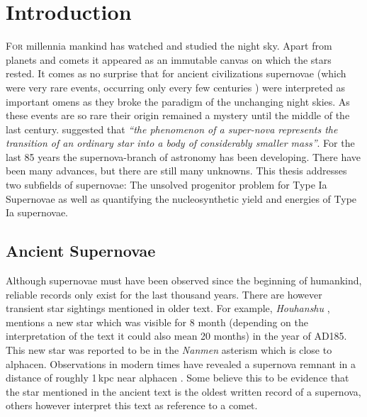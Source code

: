 \chapter{Introduction}
\label{chap:intro}

\lettrine[lines=4]{F}{or} millennia mankind has watched and studied the night sky. Apart from planets and comets it appeared as an immutable canvas on which the stars rested. It comes as no surprise that for ancient civilizations supernovae (which were very rare events, occurring only every few centuries ) were interpreted as important omens as they broke the paradigm of the unchanging night skies. As these events are so rare their origin remained a mystery until the middle of the last century. \citet{1934PNAS...20..254B} suggested that \textit{``the phenomenon of a super-nova represents the transition of an ordinary star into a body of considerably smaller mass''}. For the last 85 years the supernova-branch of astronomy has been developing. There have been many advances, but there are still many unknowns. This thesis addresses two subfields of supernovae: The unsolved progenitor problem for Type Ia Supernovae as well as quantifying the nucleosynthetic yield and energies of Type Ia supernovae.


\section{Ancient Supernovae}
\label{sec:ancientsn}
Although supernovae must have been observed since the beginning of humankind, reliable records only exist for the last thousand years. There are however transient star sightings mentioned in older text. For example, \textit{Houhanshu} \citep{2006ChJAA...6..635Z}, mentions a new star which was visible for 8 month (depending on the interpretation of the text it could also mean 20 months) in the year of AD185. This new star was reported to be in the \textit{Nanmen} asterism which is close to \gls{alphacen}.  Observations in modern times have revealed a supernova remnant in a distance of roughly 1\,kpc near \gls{alphacen} \citep{2006ChJAA...6..635Z}. Some believe this to be evidence that the star mentioned in the ancient text is  the oldest written record of a supernova, others however interpret this text as reference to a comet. 

